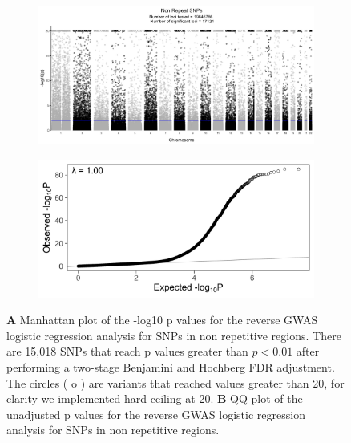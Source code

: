 \documentclass[custompaper]{MBE}%
\begin{document}
\renewcommand{\thefigure}{S\arabic{figure}}
\setcounter{figure}{0}   	

\begin{figure} \centering
    \begin{subfigure}[b]{\linewidth}
        \includegraphics[width=\hsize]{./Figures/ManhattanPlot_NonRepeatSNPs.jpg}
        \label{fig:a}
    \end{subfigure} %

    \begin{subfigure}[b]{\linewidth}
    	\center    
        \includegraphics[width=\hsize]{./Figures/QQPlot_NonRepeatSNPs.jpg}
        \label{fig:b}    
    \end{subfigure} 
    \caption{\textbf{A} Manhattan plot of the -log10 p values for the reverse GWAS logistic regression analysis for SNPs in non repetitive regions. There are 15,018 SNPs that reach p values greater than $ p < 0.01$ after performing a two-stage Benjamini and Hochberg FDR adjustment.  The circles ( o ) are variants that reached values greater than 20, for clarity we implemented hard ceiling at 20. 
  \textbf{B} QQ plot of the unadjusted p values for the reverse GWAS logistic regression analysis for SNPs in non repetitive regions.}
  \label{NRS_Manhattan}
  \end{figure}
\end{document}
